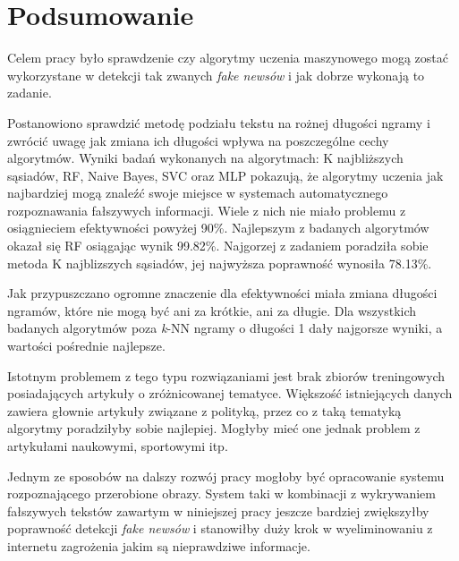 \chapter{Podsumowanie}
Celem pracy było sprawdzenie czy algorytmy uczenia maszynowego mogą zostać wykorzystane
w detekcji tak zwanych \textit{fake newsów} i jak dobrze wykonają to zadanie.


Postanowiono sprawdzić metodę podziału tekstu na rożnej długości ngramy i zwrócić uwagę 
jak zmiana ich długości wpływa na poszczególne cechy algorytmów.
Wyniki badań wykonanych na algorytmach: K najbliższych sąsiadów, RF, Naive Bayes,
SVC oraz MLP pokazują, że algorytmy uczenia jak najbardziej mogą znaleźć swoje miejsce w systemach
automatycznego rozpoznawania fałszywych informacji. Wiele z nich nie miało problemu z osiągnieciem 
efektywności powyżej 90\%. Najlepszym z badanych algorytmów okazał się RF osiągając
wynik 99.82\%. Najgorzej z zadaniem poradziła sobie metoda K najblizszych sąsiadów, jej najwyższa 
poprawność wynosiła 78.13\%.

Jak przypuszczano ogromne znaczenie dla efektywności
miała zmiana długości ngramów, które nie mogą być ani za krótkie, ani za długie.
Dla wszystkich badanych algorytmów poza \textit{k}-NN ngramy o długości 1 dały najgorsze wyniki, a wartości
pośrednie najlepsze.

Istotnym problemem z tego typu rozwiązaniami jest brak zbiorów treningowych posiadających 
artykuły o zróżnicowanej tematyce. Większość istniejących danych zawiera głownie artykuły związane z 
polityką, przez co z taką tematyką algorytmy poradziłyby sobie najlepiej. Mogłyby mieć one jednak problem 
z artykułami naukowymi, sportowymi itp.

Jednym ze sposobów na dalszy rozwój pracy mogłoby być opracowanie systemu rozpoznającego 
przerobione obrazy. System taki w kombinacji z wykrywaniem fałszywych tekstów zawartym
w niniejszej pracy jeszcze bardziej zwiększyłby poprawność detekcji \textit{fake newsów} i stanowiłby 
duży krok w wyeliminowaniu z internetu zagrożenia jakim są nieprawdziwe informacje.